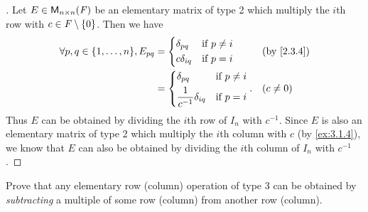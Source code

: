 \begin{proof}[]
  Let \(E \in \ms[n][n][\F]\) be an elementary matrix of type 2 which multiply the \(i\)th row with \(c \in \mathit{F} \setminus \left\lbrace0\right\rbrace\).
  Then we have
  \begin{align*}
    \forall p, q \in \set{1, \dots, n}, E_{p q} & = \begin{dcases}
                                                      \delta_{p q}   & \text{if } p \neq i \\
                                                      c \delta_{i q} & \text{if } p = i
                                                    \end{dcases}                                       &  & \by{2.3.4}           \\
                                                & = \begin{dcases}
                                                      \delta_{p q}                   & \text{if } p \neq i \\
                                                      \dfrac{1}{c^{-1}} \delta_{i q} & \text{if } p = i
                                                    \end{dcases}. &  & (c \neq 0)
  \end{align*}
  Thus \(E\) can be obtained by dividing the \(i\)th row of \(I_n\) with \(c^{-1}\).
  Since \(E\) is also an elementary matrix of type 2 which multiply the \(i\)th column with \(c\) (by \cref{ex:3.1.4}), we know that \(E\) can also be obtained by dividing the \(i\)th column of \(I_n\) with \(c^{-1}\).
\end{proof}

\begin{ex}\label{ex:3.1.11}
  Prove that any elementary row (column) operation of type 3 can be obtained by \emph{subtracting} a multiple of some row (column) from another row (column).
\end{ex}

